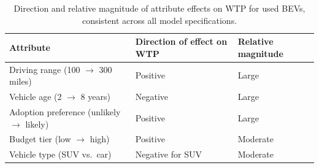 \begin{table}[pos=H]
\caption{Direction and relative magnitude of attribute effects on WTP for used BEVs, consistent across all model specifications.}
\label{table:wtp_summary}
\centering
{\renewcommand{\arraystretch}{1.3}
\begin{tabular}{lll}
\toprule
\textbf{Attribute} & \textbf{Direction of effect on WTP} & \textbf{Relative magnitude} \\
\midrule
Driving range (100 $\to$ 300 miles)          & Positive         & Large    \\
Vehicle age (2 $\to$ 8 years)                & Negative         & Large    \\
Adoption preference (unlikely $\to$ likely)  & Positive         & Large    \\
Budget tier (low $\to$ high)                 & Positive         & Moderate \\
Vehicle type (SUV vs.\ car)                  & Negative for SUV & Moderate \\
\bottomrule
\end{tabular}}
\end{table}
